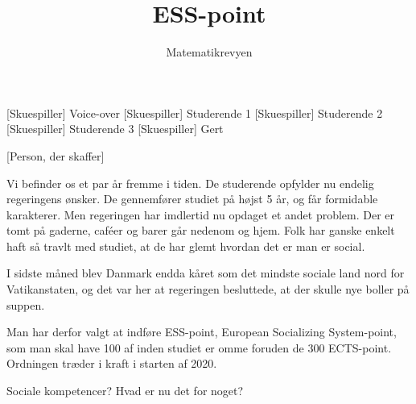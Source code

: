 \documentclass[a4paper,11pt]{article}
\title{ESS-point}
\author{Matematikrevyen}
\begin{document}
\maketitle

\begin{roles}
[Skuespiller] Voice-over
[Skuespiller] Studerende 1
[Skuespiller] Studerende 2
[Skuespiller] Studerende 3
[Skuespiller] Gert
\end{roles}

\begin{props}
[Person, der skaffer]
\end{props}

\begin{sketch}
 Vi befinder os et par år fremme i tiden. De studerende opfylder nu endelig regeringens ønsker. De gennemfører studiet på højst 5 år, og får formidable karakterer. Men regeringen har imdlertid nu opdaget et andet problem. Der er tomt på gaderne, caféer og barer går nedenom og hjem. Folk har ganske enkelt haft så travlt med studiet, at de har glemt hvordan det er man er social.

I sidste måned blev Danmark endda kåret som det mindste sociale land nord for Vatikanstaten, og det var her at regeringen besluttede, at der skulle nye boller på suppen.

Man har derfor valgt at indføre ESS-point, European Socializing System-point, som man skal have 100 af inden studiet er omme foruden de 300 ECTS-point. Ordningen træder i kraft i starten af 2020.




 Sociale kompetencer? Hvad er nu det for noget?


\end{sketch}
\end{document}

